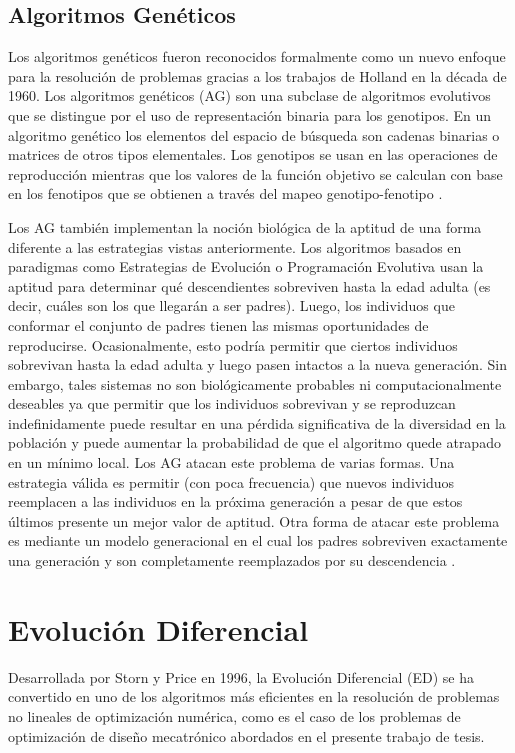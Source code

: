 \subsection{Algoritmos Genéticos}
Los algoritmos genéticos fueron reconocidos formalmente como un nuevo  enfoque para la resolución de problemas gracias a los trabajos de Holland \cite{holland1962outline} \cite{holland1969adaptive} \cite{holland1992adaptation} en la década de 1960. 
Los algoritmos genéticos (AG) son una subclase de algoritmos evolutivos que se distingue por el uso de representación binaria para los genotipos. En un algoritmo genético los elementos del espacio de búsqueda son cadenas binarias o matrices de otros tipos elementales. Los genotipos se usan en las operaciones de reproducción mientras que los valores de la función objetivo se calculan con base en los fenotipos que se obtienen a través del mapeo genotipo-fenotipo \cite{weise2009global}.

Los AG también implementan la noción biológica de la aptitud de una forma diferente a las estrategias vistas anteriormente. Los algoritmos basados en paradigmas como Estrategias de Evolución o Programación Evolutiva usan la aptitud para determinar qué descendientes sobreviven hasta la edad adulta (es decir, cuáles son los que llegarán a ser padres). Luego, los individuos que conformar el conjunto de padres tienen las mismas oportunidades de reproducirse. Ocasionalmente, esto podría permitir que ciertos individuos sobrevivan hasta la edad adulta y luego pasen intactos a la nueva generación. Sin embargo, tales sistemas no son biológicamente probables ni computacionalmente deseables ya que permitir que los individuos sobrevivan y se reproduzcan indefinidamente puede resultar en una pérdida significativa de la diversidad en la población y puede aumentar la probabilidad de que el algoritmo quede atrapado en un mínimo local. Los AG atacan este problema de varias formas. Una estrategia válida es permitir (con poca frecuencia) que nuevos individuos reemplacen a las individuos en la próxima generación a pesar de que estos últimos presente un mejor valor de aptitud. Otra forma de atacar este problema es mediante un modelo generacional en el cual los padres sobreviven exactamente una generación y son completamente reemplazados por su descendencia \cite{de2006evolutionary}.
\section{Evolución Diferencial}
Desarrollada por Storn y Price en 1996, la Evolución Diferencial (ED) se ha convertido en uno de los algoritmos más eficientes en la resolución de problemas no lineales de optimización numérica, como es el caso de los problemas de optimización de diseño mecatrónico abordados en el presente trabajo de tesis.

